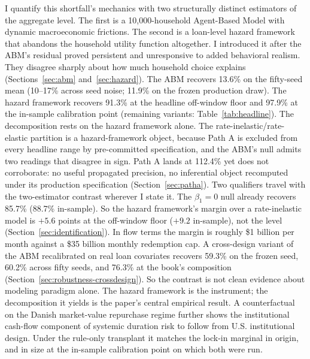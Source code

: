 \documentclass[12pt]{article}
\begin{document}
I quantify this shortfall's mechanics with two structurally distinct estimators of the aggregate level. The first is a 10,000-household Agent-Based Model with dynamic macroeconomic frictions. The second is a loan-level hazard framework that abandons the household utility function altogether. I introduced it after the ABM's residual proved persistent and unresponsive to added behavioral realism. They disagree sharply about how much household choice explains (Sections~\ref{sec:abm} and~\ref{sec:hazard}). The ABM recovers 13.6\% on the fifty-seed mean (10--17\% across seed noise; 11.9\% on the frozen production draw). The hazard framework recovers 91.3\% at the headline off-window floor and 97.9\% at the in-sample calibration point (remaining variants: Table~\ref{tab:headline}). The decomposition rests on the hazard framework alone. The rate-inelastic/rate-elastic partition is a hazard-framework object, because Path A is excluded from every headline range by pre-committed specification, and the ABM's null admits two readings that disagree in sign. Path A lands at 112.4\% yet does not corroborate: no useful propagated precision, no inferential object recomputed under its production specification (Section~\ref{sec:patha}). Two qualifiers travel with the two-estimator contrast wherever I state it. The $\beta_1 = 0$ null already recovers 85.7\% (88.7\% in-sample). So the hazard framework's margin over a rate-inelastic model is $+5.6$ points at the off-window floor ($+9.2$ in-sample), not the level (Section~\ref{sec:identification}). In flow terms the margin is roughly \$1 billion per month against a \$35 billion monthly redemption cap. A cross-design variant of the ABM recalibrated on real loan covariates recovers 59.3\% on the frozen seed, 60.2\% across fifty seeds, and 76.3\% at the book's composition (Section~\ref{sec:robustness-crossdesign}). So the contrast is not clean evidence about modeling paradigm alone. The hazard framework is the instrument; the decomposition it yields is the paper's central empirical result. A counterfactual on the Danish market-value repurchase regime further shows the institutional cash-flow component of systemic duration risk to follow from U.S. institutional design. Under the rule-only transplant it matches the lock-in marginal in origin, and in size at the in-sample calibration point on which both were run.
\end{document}
